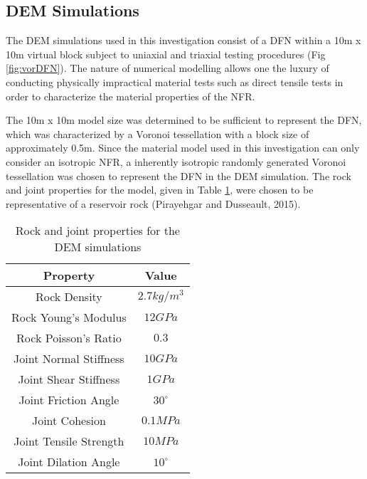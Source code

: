 \subsection{DEM Simulations}

The DEM simulations used in this investigation consist of a DFN within
a 10m x 10m virtual block subject to uniaxial and triaxial testing
procedures (Fig \ref{fig:vorDFN}). The nature of numerical modelling
allows one the luxury of conducting physically impractical material
tests such as direct tensile tests in order to characterize the material
properties of the NFR.



The 10m x 10m model size was determined to be sufficient to represent
the DFN, which was characterized by a Voronoi tessellation with a
block size of approximately 0.5m. Since the material model used in
this investigation can only consider an isotropic NFR, a inherently
isotropic randomly generated Voronoi tessellation was chosen to represent
the DFN in the DEM simulation. The rock and joint properties for the
model, given in Table \ref{tab:demProp}, were chosen to be representative
of a reservoir rock (Pirayehgar and Dusseault, 2015).

\begin{table}
\centering \caption{Rock and joint properties for the DEM simulations}
\label{tab:demProp} %
\begin{tabular}{c c}
\hline 
Property  & Value & \\
\hline 
Rock Density  & $2.7kg/m^{3}$ & \\
Rock Young's Modulus  & $12GPa$ & \\
Rock Poisson's Ratio  & $0.3$ & \\
Joint Normal Stiffness  & $10GPa$ & \\
Joint Shear Stiffness  & $1GPa$ & \\
Joint Friction Angle  & $30^{\circ}$ & \\
Joint Cohesion  & $0.1MPa$ & \\
Joint Tensile Strength  & $10MPa$ & \\
Joint Dilation Angle  & $10^{\circ}$ & \\
\hline 
\end{tabular}
\end{table}


